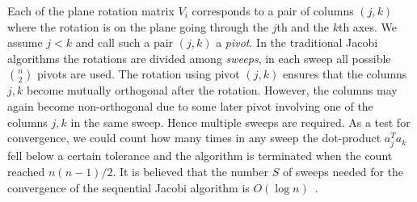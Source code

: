 \documentclass[10pt, conference, compsocconf]{IEEEtran}
\begin{document}

Each of the plane rotation matrix $V_i$ corresponds to a pair of columns $(j,k)$ where the rotation is on the plane going through the $j$th and the $k$th axes. We assume $j<k$ and call such a pair $(j,k)$ a \emph{pivot}.  In the traditional Jacobi algorithms the rotations are divided among \emph{sweeps}, in each sweep all possible ${n \choose 2}$ pivots are used. The rotation using pivot $(j,k)$ ensures that the columns $j,k$ become mutually orthogonal after the rotation. However, the columns may again become non-orthogonal due to some later pivot involving one of the columns $j,k$ in the same sweep. Hence multiple sweeps are required. As a test for convergence, we could count how many times in any sweep the dot-product $a_j^{T}a_k$ fell below a certain tolerance and the algorithm is terminated when the count reached $n(n-1)/2$. It is believed that the number $S$ of sweeps needed for the convergence of the sequential Jacobi algorithm is $O(\log n)$~\cite{golub2012matrix}.  
\end{document}
